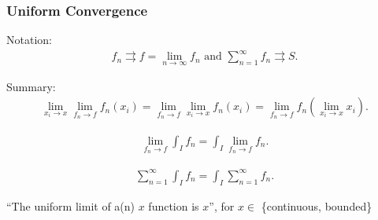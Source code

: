 \hypertarget{uniform-convergence}{%
\subsubsection{Uniform Convergence}\label{uniform-convergence}}

Notation:
\begin{align*}  
f_n \rightrightarrows f= \lim_{n\to\infty} f_n \text{ and } \sum_{n=1}^\infty f_n \rightrightarrows S
.\end{align*}

Summary:
\begin{align*}  
\lim_{x_i \to x} \lim_{f_n \to f} f_n(x_i) = \lim_{f_n \to f} \lim_{x_i \to x} f_n(x_i) = \lim_{f_n \to f} f_n(\lim_{x_i \to x} x_i)
.\end{align*}

\begin{align*}  
\lim_{f_n \to f} \int_I f_n = \int_I \lim_{f_n \to f} f_n
.\end{align*}

\begin{align*}  
\sum_{n=1}^\infty \int_I f_n = \int_I \sum_{n=1}^\infty f_n
.\end{align*}

``The uniform limit of a(n) \(x\) function is \(x\)'', for \(x \in\)
\{continuous, bounded\}

